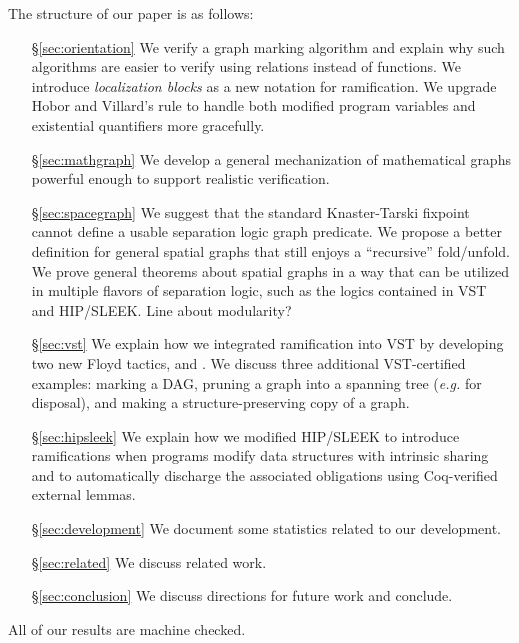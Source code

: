 The structure of our paper is as follows:
\begin{itemize}
\item[\S\ref{sec:orientation}] We verify a graph marking algorithm and explain why such algorithms are easier to verify using relations instead of functions.  We introduce \emph{localization blocks} as a new notation for ramification.  We upgrade Hobor and Villard's  rule to handle both modified program variables and existential quantifiers more gracefully.
\item[\S\ref{sec:mathgraph}] We develop a general mechanization of mathematical graphs powerful enough to support realistic verification. %
\item[\S\ref{sec:spacegraph}] We suggest that the standard Knaster-Tarski fixpoint~\cite{tarski:fixpoint} cannot define a usable separation logic graph predicate.  We propose a better definition for general spatial graphs that still enjoys a ``recursive'' fold/unfold.  We prove general theorems about spatial graphs in a way that can be utilized in multiple flavors of separation logic, such as the logics contained in VST and HIP/SLEEK. {\color{magenta} Line about modularity?}
\item[\S\ref{sec:vst}] We explain how we integrated ramification into VST by developing two new Floyd tactics,  and .  We discuss three additional VST-certified examples: marking a DAG, pruning a graph into a spanning tree (\emph{e.g.} for disposal), and making a structure-preserving copy of a graph.
\item[\S\ref{sec:hipsleek}] We explain how we modified HIP/SLEEK to introduce ramifications when programs modify data structures with intrinsic sharing and to automatically discharge the associated obligations using Coq-verified external lemmas.
\item[\S\ref{sec:development}] We document some statistics related to our development.
\item[\S\ref{sec:related}] We discuss related work.
\item[\S\ref{sec:conclusion}] We discuss directions for future work and conclude.
\end{itemize}
All of our results are machine checked.


